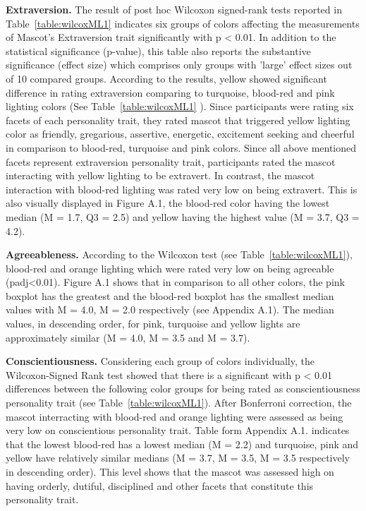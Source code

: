 \par \textbf{Extraversion.} The result of post hoc Wilcoxon signed-rank tests reported in Table~\ref{table:wilcoxML1} indicates six groups of colors affecting the measurements of Mascot’s Extraversion trait significantly with p < 0.01. In addition to the statistical significance (p-value), this table also reports the substantive significance (effect size) which comprises only groups with 'large' effect sizes out of 10 compared groups. According to the results, yellow showed significant difference in rating extraversion comparing to turquoise, blood-red and pink lighting colors (See Table~\ref{table:wilcoxML1} ). Since participants were rating six facets of each personality trait, they rated mascot that triggered yellow lighting color as friendly, gregarious, assertive, energetic, excitement seeking and cheerful in comparison to blood-red, turquoise and pink colors. Since all above mentioned facets represent extraversion personality trait, participants rated the mascot interacting with yellow lighting to be extravert. In contrast, the mascot interaction with blood-red lighting was rated very low on being extravert. This is also visually displayed in Figure A.1, the blood-red color having the lowest median (M = 1.7, Q3 = 2.5) and yellow having the highest value (M = 3.7, Q3 = 4.2).
\par \textbf{Agreeableness.} According to the Wilcoxon test (see Table~\ref{table:wilcoxML1}), blood-red and orange lighting which were rated very low on being agreeable (padj<0.01). Figure A.1 shows that in comparison to all other colors, the pink boxplot has the greatest and the blood-red boxplot has the smallest median values with M = 4.0, M = 2.0 respectively (see Appendix A.1). The median values, in descending order, for pink, turquoise and yellow lights are approximately similar (M = 4.0, M = 3.5 and M = 3.7). 
\par \textbf{Conscientiousness.} Considering each group of colors individually, the Wilcoxon-Signed Rank test showed that there is a significant with p < 0.01 differences between the following color groups for being rated as conscientiousness personality trait (see Table~\ref{table:wilcoxML1}). After Bonferroni correction, the mascot interracting with blood-red and orange lighting were assessed as being very low on conscientious personality trait. Table form Appendix A.1. indicates that the lowest blood-red has a lowest median (M = 2.2) and turquoise, pink and yellow have relatively similar medians (M = 3.7, M = 3.5, M = 3.5 respectively in descending order). This level shows that the mascot was assessed high on having orderly, dutiful, disciplined and other facets that constitute this personality trait.
